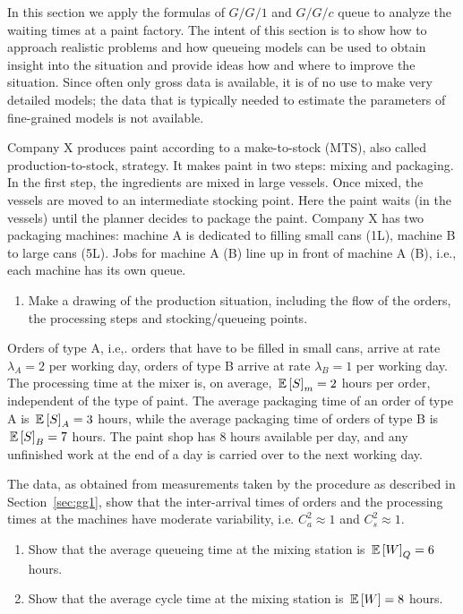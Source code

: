 \begin{question}[use=false]

In this section we apply the formulas of $G/G/1$ and $G/G/c$ queue to
analyze the waiting times at a paint factory. The intent of this
section is to show how to approach realistic problems and how queueing
models can be used to obtain insight into the situation and provide
ideas how and where to improve the situation. Since often only gross
data is available, it is of no use to make very detailed models; the
data that is typically needed to estimate the parameters of
fine-grained models is not available. 


Company X produces paint according to a make-to-stock (MTS), also
called production-to-stock, strategy. It makes paint in two steps:
mixing and packaging. In the first step, the ingredients are mixed in
large vessels. Once mixed, the vessels are moved to an intermediate
stocking point. Here the paint waits (in the vessels) until the
planner decides to package the paint. Company X has two packaging
machines: machine A is dedicated to filling small cans (1L), machine B
to large cans (5L). Jobs for machine A (B) line up in front of machine
A (B), i.e., each machine has its own queue.

\begin{enumerate}
\item 
  Make a drawing of the production situation, including the flow of the
  orders, the processing steps and stocking/queueing points.
\end{enumerate}

Orders of type A, i.e,. orders that have to be filled in small cans,
arrive at rate $\lambda_A = 2$ per working day, orders of type B
arrive at rate $\lambda_B =1$ per working day. The processing time at
the mixer is, on average, $\,\mathbb{E}\left[S\right]_m= 2$ hours per order, independent of
the type of paint. The average packaging time of an order of type A is
$\,\mathbb{E}\left[S\right]_A = 3$ hours, while the average packaging time of orders of type B
is $\,\mathbb{E}\left[S\right]_B=7$ hours. The paint shop has 8 hours available per day, and
any unfinished work at the end of a day is carried over to the next
working day.

The data, as obtained from measurements taken by the procedure as
described in Section~\ref{sec:gg1}, show that the
inter-arrival times of orders and the processing times at the machines
have moderate variability, i.e. $C_a^2 \approx 1$ and $C_s^2\approx 1$. 

  \begin{enumerate}[resume]
  \item Show that the average queueing time at the mixing station is $\,\mathbb{E}\left[W\right]_Q = 6$ hours.
  \item Show that the average cycle time at the mixing station is $\,\mathbb{E}\left[W\right] = 8$ hours.
  \end{enumerate}


\end{question}

